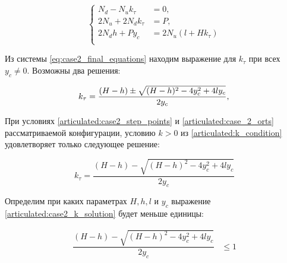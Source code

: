 \begin{equation}
\label{eq:case2_final_equations}
\left\{
\begin{alignedat}{3}
  N_d - N_uk_\tau &= 0,\\
  2N_u + 2N_d k_\tau &= P,\\
  2 N_d h + P y_c &= 2 N_u (l + H k_\tau)\\
  \end{alignedat}
\right.
\end{equation}


Из системы \ref{eq:case2_final_equations} находим выражение для  $k_\tau$ при всех $y_c \ne 0$. Возможны два решения:

\begin{equation}
\label{eq:case2_k12}
      k_\tau = \dfrac{(H-h) \pm \sqrt{(H-h)^2 - 4y^2_c + 4ly_c}}{2y_c}, \\
\end{equation}

При условиях \ref{articulated:case2_step_points} и \ref{articulated:case_2_orts} рассматриваемой конфигурации, условию $k>0$ из \ref{articulated:k_condition} удовлетворяет только следующее решение:

\begin{equation}
\label{articulated:case2_k_solution}
k_\tau = \dfrac{(H-h) - \sqrt{(H-h)^2 - 4y_c^2 + 4ly_c}}{2y_c}
\end{equation}

Определим при каких параметрах $H,h,l$ и $y_c$ выражение \ref{articulated:case2_k_solution} будет меньше единицы:

\begin{equation}
\label{articulated:case2_k_less_than_1}
\begin{alignedat}{3}
 \dfrac{(H - h) - \sqrt{(H-h)^2 - 4y_c^2+4ly_c}}{2y_c}  & \leq 1 \\
\end{alignedat}
\end{equation}

